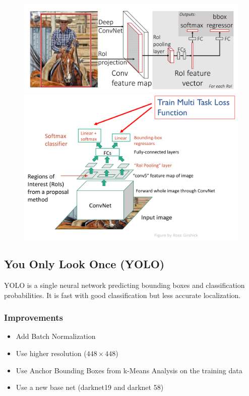 \begin{figure}[h]
	\centering
	\includegraphics[width=0.7\linewidth]{img/fast_r-cnn_structure}
	\includegraphics[width=0.7\linewidth]{img/fast_r-cnn_structure2}
\end{figure}

\subsection{You Only Look Once (YOLO)}
YOLO is a single neural network predicting bounding boxes and classification probabilities.
It is fast with good classification but less accurate localization.

\subsubsection{Improvements}
\begin{itemize}
	\item Add Batch Normalization
	\item Use higher resolution ($448\times 448$)
	\item Use Anchor Bounding Boxes from k-Means Analysis on the training data
	\item Use a new base net (darknet19 and darknet 58)
\end{itemize}
